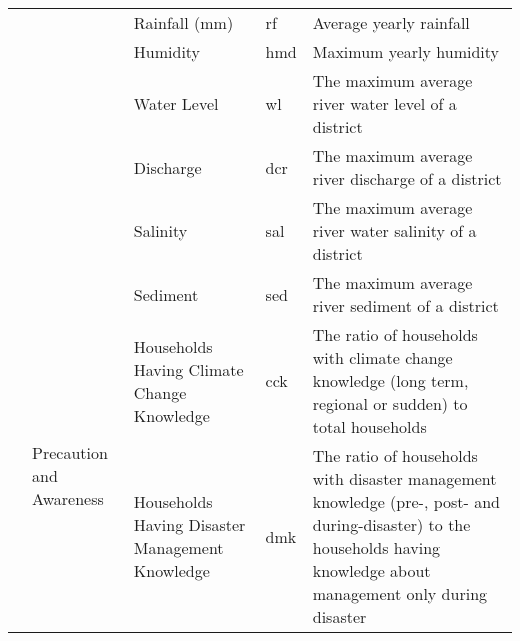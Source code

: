 \begin{table*}[!ht]
{\begin{tabular}{|l|l|p{5.1cm}|l|p{9.5cm}|}
                            &                                           & Rainfall (mm)                                   & rf               & Average yearly rainfall                                                                                                                                                                        \\ \cline{3-5} 
                            &                                           & Humidity                                        & hmd              & Maximum yearly humidity                                                                                                                                                                   \\ \cline{3-5} 
                            &                                                                                    & Water Level                                       & wl               & The maximum average river water level of a district                                   \\ \cline{3-5} 
                             &                                           & Discharge                                      & dcr            & The maximum average river discharge of a district                                             \\ \cline{3-5} 
                            &                                           & Salinity                                      & sal            & The maximum average river water salinity of a district                                             \\ \cline{3-5} 
                            &                                           & Sediment                                      & sed              & The maximum average river sediment of a district                                                                                                                                                                    \\ \cline{2-5} 
                            & \multirow{5}{*}{Precaution and Awareness} & Households Having Climate Change Knowledge      & cck              & The ratio of households with climate change knowledge (long term, regional or sudden) to total households                                                                                      \\ \cline{3-5} 
                            &                                           & Households Having Disaster Management Knowledge & dmk              & The ratio of households with disaster management knowledge (pre-, post- and during-disaster) to the households having knowledge about management only during disaster                 \\ \cline{3-5} 

\end{tabular}}
\end{table*}
